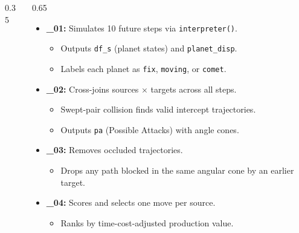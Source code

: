 \documentclass[aspectratio=169]{beamer}
\begin{document}
\begin{frame}
\begin{columns}[T]
\begin{column}{0.35\textwidth}
{}
        \end{column}
        \begin{column}{0.65\textwidth}
            \small
            \begin{itemize}
                \item \textbf{\_01:} Simulates 10 future steps via \texttt{interpreter()}.
                \begin{itemize}
                    \item Outputs \texttt{df\_s} (planet states) and \texttt{planet\_disp}.
                    \item Labels each planet as \texttt{fix}, \texttt{moving}, or \texttt{comet}.
                \end{itemize}
                \item \textbf{\_02:} Cross-joins sources $\times$ targets across all steps.
                \begin{itemize}
                    \item Swept-pair collision finds valid intercept trajectories.
                    \item Outputs \texttt{pa} (Possible Attacks) with angle cones.
                \end{itemize}
                \item \textbf{\_03:} Removes occluded trajectories.
                \begin{itemize}
                    \item Drops any path blocked in the same angular cone by an earlier target.
                \end{itemize}
                \item \textbf{\_04:} Scores and selects one move per source.
                \begin{itemize}
                    \item Ranks by time-cost-adjusted production value.
                \end{itemize}
            \end{itemize}
        \end{column}
    \end{columns}
\end{frame}
\end{document}
